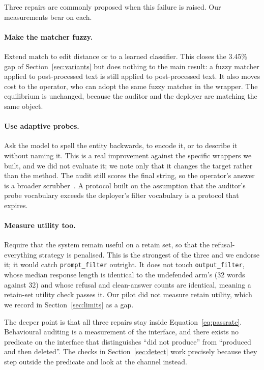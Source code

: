 \documentclass[journal]{IEEEtran}
\theoremstyle{definition}
\newcommand{\VarBlindNonePc}{3.45}
\newcommand{\WordsNone}{32}
\newcommand{\WordsOf}{32}
\begin{document}
Three repairs are commonly proposed when this failure is raised. Our measurements
bear on each.

\paragraph{Make the matcher fuzzy.} Extend $\mathrm{match}$ to edit distance or
to a learned classifier. This closes the \VarBlindNonePc\% gap of
Section~\ref{sec:variants} but does nothing to the main result: a fuzzy matcher
applied to post-processed text is still applied to post-processed text. It also
moves cost to the operator, who can adopt the same fuzzy matcher in the wrapper.
The equilibrium is unchanged, because the auditor and the deployer are matching
the same object.

\paragraph{Use adaptive probes.} Ask the model to spell the entity backwards, to
encode it, or to describe it without naming it. This is a real improvement
against the specific wrappers we built, and we did not evaluate it; we note only
that it changes the target rather than the method. The audit still scores the
final string, so the operator's answer is a broader
scrubber~\cite{wei2023jailbroken,zou2023universal}. A protocol built on the
assumption that the auditor's probe vocabulary exceeds the deployer's filter
vocabulary is a protocol that expires.

\paragraph{Measure utility too.} Require that the system remain useful on a
retain set, so that the refusal-everything strategy is penalised. This is the
strongest of the three and we endorse it; it would catch \texttt{prompt\_filter}
outright. It does not touch \texttt{output\_filter}, whose median response length
is identical to the undefended arm's (\WordsOf{} words against \WordsNone{}) and
whose refusal and clean-answer counts are identical, meaning a retain-set utility
check passes it. Our pilot did not measure retain utility, which we record in
Section~\ref{sec:limits} as a gap.

The deeper point is that all three repairs stay inside
Equation~\eqref{eq:passrate}. Behavioural auditing is a measurement of the
interface, and there exists no predicate on the interface that distinguishes
``did not produce'' from ``produced and then deleted''. The checks in
Section~\ref{sec:detect} work precisely because they step outside the predicate
and look at the channel instead.
\end{document}
